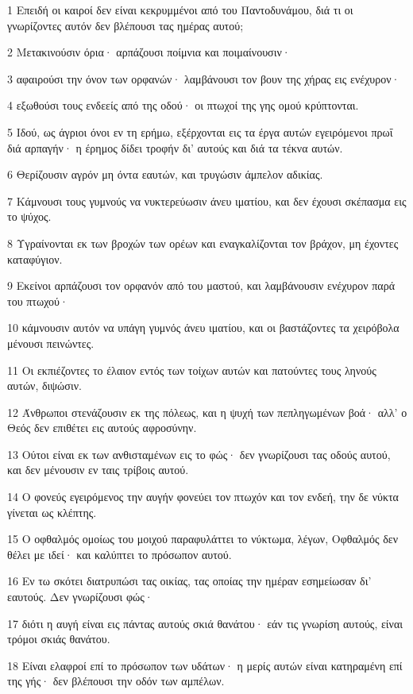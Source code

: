 \par 1 Επειδή οι καιροί δεν είναι κεκρυμμένοι από του Παντοδυνάμου, διά τι οι γνωρίζοντες αυτόν δεν βλέπουσι τας ημέρας αυτού;
\par 2 Μετακινούσιν όρια· αρπάζουσι ποίμνια και ποιμαίνουσιν·
\par 3 αφαιρούσι την όνον των ορφανών· λαμβάνουσι τον βουν της χήρας εις ενέχυρον·
\par 4 εξωθούσι τους ενδεείς από της οδού· οι πτωχοί της γης ομού κρύπτονται.
\par 5 Ιδού, ως άγριοι όνοι εν τη ερήμω, εξέρχονται εις τα έργα αυτών εγειρόμενοι πρωΐ διά αρπαγήν· η έρημος δίδει τροφήν δι' αυτούς και διά τα τέκνα αυτών.
\par 6 Θερίζουσιν αγρόν μη όντα εαυτών, και τρυγώσιν άμπελον αδικίας.
\par 7 Κάμνουσι τους γυμνούς να νυκτερεύωσιν άνευ ιματίου, και δεν έχουσι σκέπασμα εις το ψύχος.
\par 8 Υγραίνονται εκ των βροχών των ορέων και εναγκαλίζονται τον βράχον, μη έχοντες καταφύγιον.
\par 9 Εκείνοι αρπάζουσι τον ορφανόν από του μαστού, και λαμβάνουσιν ενέχυρον παρά του πτωχού·
\par 10 κάμνουσιν αυτόν να υπάγη γυμνός άνευ ιματίου, και οι βαστάζοντες τα χειρόβολα μένουσι πεινώντες.
\par 11 Οι εκπιέζοντες το έλαιον εντός των τοίχων αυτών και πατούντες τους ληνούς αυτών, διψώσιν.
\par 12 Άνθρωποι στενάζουσιν εκ της πόλεως, και η ψυχή των πεπληγωμένων βοά· αλλ' ο Θεός δεν επιθέτει εις αυτούς αφροσύνην.
\par 13 Ούτοι είναι εκ των ανθισταμένων εις το φώς· δεν γνωρίζουσι τας οδούς αυτού, και δεν μένουσιν εν ταις τρίβοις αυτού.
\par 14 Ο φονεύς εγειρόμενος την αυγήν φονεύει τον πτωχόν και τον ενδεή, την δε νύκτα γίνεται ως κλέπτης.
\par 15 Ο οφθαλμός ομοίως του μοιχού παραφυλάττει το νύκτωμα, λέγων, Οφθαλμός δεν θέλει με ιδεί· και καλύπτει το πρόσωπον αυτού.
\par 16 Εν τω σκότει διατρυπώσι τας οικίας, τας οποίας την ημέραν εσημείωσαν δι' εαυτούς. Δεν γνωρίζουσι φώς·
\par 17 διότι η αυγή είναι εις πάντας αυτούς σκιά θανάτου· εάν τις γνωρίση αυτούς, είναι τρόμοι σκιάς θανάτου.
\par 18 Είναι ελαφροί επί το πρόσωπον των υδάτων· η μερίς αυτών είναι κατηραμένη επί της γής· δεν βλέπουσι την οδόν των αμπέλων.
